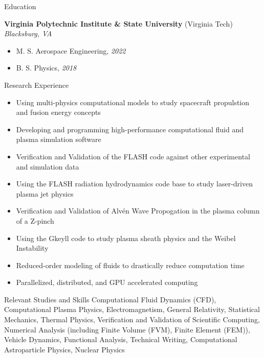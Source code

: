 \documentclass{resume} %
\begin{document}
\begin{rSection}{Education}

    \textbf{Virginia Polytechnic Institute \& State University} (Virginia Tech) \hfill \textit{Blacksburg, VA}
     \begin{itemize}
        \itemsep -3pt {} 
         \item M. S. Aerospace Engineering, \textit{2022}
         \item B. S. Physics, \textit{2018}
     \end{itemize}


\end{rSection}

\begin{rSection}{Research Experience}
    \begin{itemize}
        \itemsep -3pt {}
        \item Using multi-physics computational models to study spacecraft propulstion and fusion energy concepts
        \item Developing and programming high-performance computational fluid and plasma simulation software
        \item Verification and Validation of the FLASH code against other experimental and simulation data
        \item Using the FLASH radiation hydrodynamics code base to study laser-driven plasma jet physics
        \item Verification and Validation of Alv\'en Wave Propogation in the plasma column of a Z-pinch
        \item Using the Gkeyll code to study plasma sheath physics and the Weibel Instability
        \item Reduced-order modeling of fluids to drastically reduce computation time
        \item Parallelized, distributed, and GPU accelerated computing
    \end{itemize}
\end{rSection}

\begin{rSection}{Relevant Studies and Skills}
    Computational Fluid Dynamics (CFD), Computational Plasma Physics, Electromagnetism, General Relativity, Statistical Mechanics, Thermal Physics, Verification and Validation of Scientific Computing, Numerical Analysis (including Finite Volume (FVM), Finite Element (FEM)), Vehicle Dynamics, Functional Analysis, Technical Writing, Computational Astroparticle Physics, Nuclear Physics
\end{rSection}
\end{document}
